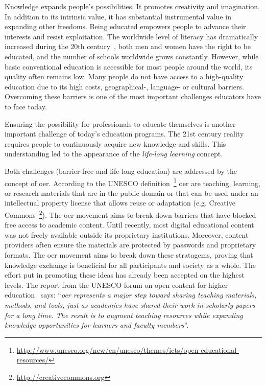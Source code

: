 \documentclass[PhD, Submit, ngerman,UKenglish,table]{scrbook}
\begin{document}
Knowledge expands people's possibilities.
It promotes creativity and imagination.
In addition to its intrinsic value, it has substantial instrumental value in expanding other freedoms.
Being educated empowers people to advance their interests and resist exploitation.
The worldwide level of literacy has dramatically increased during the 20th century~\cite{klugman2010human},
both men and women have the right to be educated, and the number of schools worldwide grows constantly.
However, while basic conventional education is accessible for most people around the world, its quality often remains low.
Many people do not have access to a high-quality education due to its high costs, geographical-, language- or cultural barriers.
Overcoming these barriers is one of the most important challenges educators have to face today.

Ensuring the possibility for professionals to educate themselves is another important challenge of today's education programs.
The 21st century reality requires people to continuously acquire new knowledge and skills.
This understanding led to the appearance of the \emph{life-long learning} concept.

Both challenges (barrier-free and life-long education) are addressed by the concept of \gls{oer}.
According to the UNESCO definition~\footnote{\url{http://www.unesco.org/new/en/unesco/themes/icts/open-educational-resources/}} \gls{oer} are teaching, learning, or research materials that are in the public domain or that can be used under an intellectual property license that allows reuse or adaptation (e.g. Creative Commons~\footnote{\url{http://creativecommons.org}}).
The \gls{oer} movement aims to break down barriers that have blocked free access to academic content.
Until recently, most digital educational content was not freely available outside its proprietary institutions.
Moreover, content providers often ensure the materials are protected by passwords and proprietary formats.
The \gls{oer} movement aims to break down these stratagems, proving that knowledge exchange is beneficial for all participants and society as a whole.
The effort put in promoting these ideas has already been accepted on the highest levels. 
The report from the UNESCO forum on open content for higher education~\cite{unesco} says: ``\emph{\gls{oer} represents a major step toward sharing teaching materials, methods, and tools, just as academics have shared their work in scholarly papers for a long time.
The result is to augment teaching resources while expanding knowledge opportunities for learners and faculty members}''. 
\end{document}
